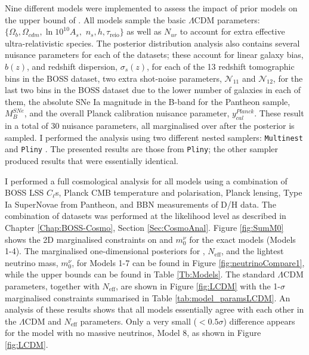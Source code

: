  Nine different models were implemented to assess the impact of prior models on the upper bound of \NM{}. All models sample the basic $\Lambda$CDM parameters: $\{\Omega_b, \Omega_{cdm}, \ln 10^{10}A_s,$ $ n_s, h, \tau_{\text{reio}}\}$ as well as $N_{ur}$ to account for extra effective ultra-relativistic species. The posterior distribution analysis also contains several nuisance parameters for each of the datasets; these account for linear galaxy bias, $b(z)$, and redshift dispersion, $\sigma_s(z)$, for each of the 13 redshift tomographic bins in the BOSS dataset, two extra shot-noise parameters, $\mathcal{N}_{11}$ and  $\mathcal{N}_{12}$, for the last two bins in the BOSS dataset due to the lower number of galaxies in each of them, the absolute SNe Ia magnitude in the B-band for the Pantheon sample, $M_B^{SNe}$, and the overall Planck calibration nuisance parameter, $y_{cal}^{Planck}$. These result in a total of 30 nuisance parameters, all marginalised over after the posterior is sampled. I performed the analysis using two different nested samplers: \texttt{Multinest} \citep{2009Multinest} and \texttt{Pliny} \citep{PlinyRichardThesis}. The presented results are those from \texttt{Pliny}; the other sampler produced results that were essentially identical. %
 
 
\qquad I performed a full cosmological analysis for all models using a combination of BOSS LSS $C_{\ell}$s, Planck CMB temperature and polarisation, Planck lensing, Type Ia SuperNovae from Pantheon, and BBN measurements of D/H data. The combination of datasets was performed at the likelihood level as described in Chapter \ref{Chap:BOSS-Cosmo}, Section \ref{Sec:CosmoAnal}. Figure \ref{fig:SumM0} shows the 2D marginalised constraints on \NM{} and $m_0^{\nu}$ for the exact models (Models 1-4). The marginalised one-dimensional posteriors for \NM{}, $N_{\text{eff}}$, and the lightest neutrino mass, $m_{0}^{\nu}$, for Models 1-7 can be found in Figure \ref{fig:neutrinoCompare1}, while the upper bounds can be found in Table \ref{Tb:Models}. The standard $\Lambda$CDM parameters, together with $N_{\text{eff}}$, are shown in Figure \ref{fig:LCDM} with the 1-$\sigma$ marginalised constraints summarised in Table \ref{tab:model_paramsLCDM}. An analysis of these results shows that all models essentially agree with each other in the $\Lambda$CDM and $N_{\text{eff}}$ parameters. Only a very small ($< 0.5 \sigma$) difference appears for the model with no massive neutrinos, Model 8, as shown in Figure \ref{fig:LCDM}.

